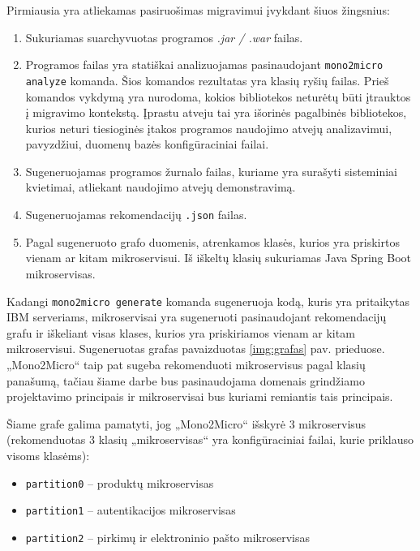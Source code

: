 \documentclass{VUMIFPSbakalaurinis}
\begin{document}
Pirmiausia yra atliekamas pasiruošimas migravimui įvykdant šiuos žingsnius:
\begin{enumerate}
    \item Sukuriamas suarchyvuotas programos \emph{.jar / .war} failas. 

    \item Programos failas yra statiškai analizuojamas pasinaudojant \verb|mono2micro analyze| komanda. Šios komandos rezultatas yra klasių ryšių failas. Prieš komandos vykdymą yra nurodoma, kokios bibliotekos neturėtų būti įtrauktos į migravimo kontekstą. Įprastu atveju tai yra išorinės pagalbinės bibliotekos, kurios neturi tiesioginės įtakos programos naudojimo atvejų analizavimui, pavyzdžiui, duomenų bazės konfigūraciniai failai.

    \item Sugeneruojamas programos žurnalo failas, kuriame yra surašyti sisteminiai kvietimai, atliekant naudojimo atvejų demonstravimą.

    \item Sugeneruojamas rekomendacijų \verb|.json| failas.

    \item Pagal sugeneruoto grafo duomenis, atrenkamos klasės, kurios yra priskirtos vienam ar kitam mikroservisui. Iš iškeltų klasių sukuriamas Java Spring Boot mikroservisas.
    
\end{enumerate}

Kadangi \verb|mono2micro generate| komanda sugeneruoja kodą, kuris yra pritaikytas IBM serveriams, mikroservisai yra sugeneruoti pasinaudojant rekomendacijų grafu ir iškeliant visas klases, kurios yra priskiriamos vienam ar kitam mikroservisui. Sugeneruotas grafas pavaizduotas \ref{img:grafas} pav. prieduose. „Mono2Micro“ taip pat sugeba rekomenduoti mikroservisus pagal klasių panašumą, tačiau šiame darbe bus pasinaudojama domenais grindžiamo projektavimo principais ir mikroservisai bus kuriami remiantis tais principais.

Šiame grafe galima pamatyti, jog „Mono2Micro“ išskyrė 3 mikroservisus (rekomenduotas 3 klasių „mikroservisas“ yra konfigūraciniai failai, kurie priklauso visoms klasėms):
\begin{itemize}
    \item \verb|partition0| -- produktų mikroservisas

    \item \verb|partition1| -- autentikacijos mikroservisas

    \item \verb|partition2| -- pirkimų ir elektroninio pašto mikroservisas
\end{itemize}
\end{document}
